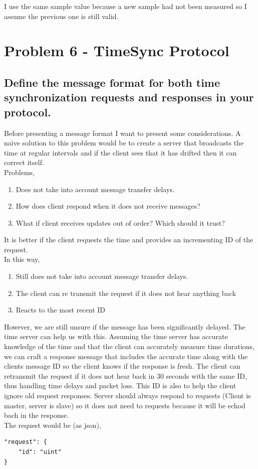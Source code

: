 \documentclass{article}
\begin{document}
	I use the same sample value because a new sample had not been measured so I assume the previous one is still valid.

\section{Problem 6 - TimeSync Protocol}

\subsection{Define the message format for both time synchronization requests and responses
in your protocol.}
		Before presenting a message format I want to present some considerations. A naive solution to this problem would be to create a 
		server that broadcasts the time at regular intervals and if the client sees that it has drifted then it can correct itself. \\

		Problems,
		\begin{enumerate}
			\item Does not take into account message transfer delays.
			\item How does client respond when it does not receive messages?
			\item What if client receives updates out of order? Which should it trust?
		\end{enumerate}

		It is better if the client requests the time and provides an incrementing ID of the request.\\
		In this way,
		\begin{enumerate}
			\item Still does not take into account message transfer delays.
			\item The client can re transmit the request if it does not hear anything back
			\item Reacts to the most recent ID
		\end{enumerate}

		However, we are still unsure if the message has been significantly delayed. The time server can help us with this.
		Assuming the time server has accurate knowledge of the time and that the client can accurately measure time durations, we can craft a response message that includes the accurate time along with the clients message ID so
		the client knows if the response is fresh. The client can retransmit the request if it does not hear back in 30 seconds with the same ID, thus handling time delays and packet loss. This ID is also to help the client ignore old request responses. Server should always respond to requests (Client is master, server is slave) so it does not need to 
		requests because it will be echod bach in the response.\\
		The request would be (as json),
		\begin{verbatim}
"request": {
	"id": "uint"
}
		\end{verbatim}
\end{document}

